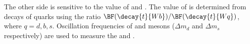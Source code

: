 The other side is sensitive to the value of  and .
The value of  is determined from decays of \tquark quarks using the ratio
$\BF(\decay{t}{Wb})/\BF(\decay{t}{Wq})$, where $q=d,b,s$.
Oscillation frequencies of \Bd and \Bs mesons ($\Delta m_d$ and $\Delta m_s$ respectively) are used
to measure the  and .



